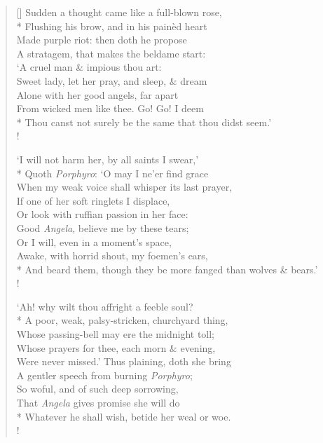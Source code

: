\documentclass[MAIN]{subfiles}
\begin{document}
\begin{verse}[\versewidth]
\vin Sudden a thought came like a full-blown rose,\\*
\vin Flushing his brow, and in his pain\`ed heart\\
\vin Made purple riot: then doth he propose\\
\vin A stratagem, that makes the beldame start:\\
\vin `A cruel man \& impious thou art:\\
\vin Sweet lady, let her pray, and sleep, \& dream\\
\vin Alone with her good angels, far apart\\
\vin From wicked men like thee. Go! Go! I deem\\*
Thou canst not surely be the same that thou didst seem.'\\!

\vin `I will not harm her, by all saints I swear,'\\*
\vin Quoth \emph{Porphyro}: `O may I ne'er find grace\\
\vin When my weak voice shall whisper its last prayer,\\
\vin If one of her soft ringlets I displace,\\
\vin Or look with ruffian passion in her face:\\
\vin Good \emph{Angela}, believe me by these tears;\\
\vin Or I will, even in a moment's space,\\
\vin Awake, with horrid shout, my foemen's ears,\\*
And beard them, though they be more fanged than wolves \& bears.'\\!

\vin `Ah! why wilt thou affright a feeble soul?\\*
\vin A poor, weak, palsy-stricken, churchyard thing,\\
\vin Whose passing-bell may ere the midnight toll;\\
\vin Whose prayers for thee, each morn \& evening,\\
\vin Were never missed.' Thus plaining, doth she bring\\
\vin A gentler speech from burning \emph{Porphyro};\\
\vin So woful, and of such deep sorrowing,\\
\vin That \emph{Angela} gives promise she will do\\*
Whatever he shall wish, betide her weal or woe.\\!


\end{verse}
\end{document}
